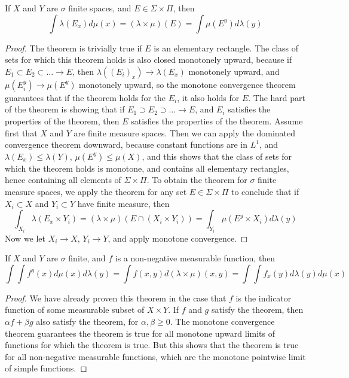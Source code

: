 \begin{theorem}
    If $X$ and $Y$ are $\sigma$ finite spaces, and $E \in \Sigma \times \Pi$, then
    \[ \int \lambda(E_x) d\mu(x) = (\lambda \times \mu)(E) = \int \mu(E^y) d\lambda(y) \]
\end{theorem}
\begin{proof}
    The theorem is trivially true if $E$ is an elementary rectangle. The class of sets for which this theorem holds is also closed monotonely upward, because if $E_1 \subset E_2 \subset \dots \to E$, then $\lambda((E_i)_x) \to \lambda(E_x)$ monotonely upward, and $\mu(E_i^y) \to \mu(E^y)$ monotonely upward, so the monotone convergence theorem guarantees that if the theorem holds for the $E_i$, it also holds for $E$. The hard part of the theorem is showing that if $E_1 \supset E_2 \supset \dots \to E$, and $E_i$ satisfies the properties of the theorem, then $E$ satisfies the properties of the theorem. Assume first that $X$ and $Y$ are finite measure spaces. Then we can apply the dominated convergence theorem downward, because constant functions are in $L^1$, and $\lambda(E_x) \leq \lambda(Y)$, $\mu(E^y) \leq \mu(X)$, and this shows that the class of sets for which the theorem holds is monotone, and contains all elementary rectangles, hence containing all elements of $\Sigma \times \Pi$. To obtain the theorem for $\sigma$ finite measure spaces, we apply the theorem for any set $E \in \Sigma \times \Pi$ to conclude that if $X_i \subset X$ and $Y_i \subset Y$ have finite measure, then
    \[ \int_{X_i} \lambda(E_x \times Y_i) = (\lambda \times \mu)(E \cap (X_i \times Y_i)) = \int_{Y_i} \mu(E^y \times X_i) d\lambda(y) \]
    Now we let $X_i \to X$, $Y_i \to Y$, and apply monotone convergence.
\end{proof}

\begin{theorem}[Tonelli]
    If $X$ and $Y$ are $\sigma$ finite, and $f$ is a non-negative measurable function, then
    \[ \int \int f^y(x) d\mu(x) d\lambda(y) = \int f(x,y) d(\lambda \times \mu)(x,y) = \int \int f_x(y) d\lambda(y) d\mu(x) \]
\end{theorem}
\begin{proof}
    We have already proven this theorem in the case that $f$ is the indicator function of some measurable subset of $X \times Y$. If $f$ and $g$ satisfy the theorem, then $\alpha f + \beta g$ also satisfy the theorem, for $\alpha, \beta \geq 0$. The monotone convergence theorem guarantees the theorem is true for all monotone upward limits of functions for which the theorem is true. But this shows that the theorem is true for all non-negative measurable functions, which are the monotone pointwise limit of simple functions.
\end{proof}

